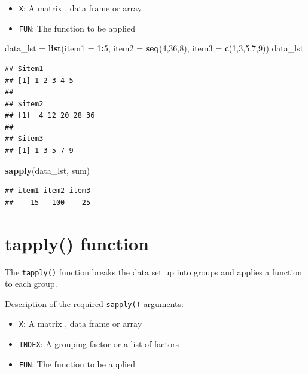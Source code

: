 \documentclass[
]{book}
\newenvironment{Shaded}{\begin{snugshade}}{\end{snugshade}}
\newcommand{\DataTypeTok}[1]{\textcolor[rgb]{0.13,0.29,0.53}{#1}}
\newcommand{\DecValTok}[1]{\textcolor[rgb]{0.00,0.00,0.81}{#1}}
\newcommand{\KeywordTok}[1]{\textcolor[rgb]{0.13,0.29,0.53}{\textbf{#1}}}
\newcommand{\NormalTok}[1]{#1}
\newcommand{\OperatorTok}[1]{\textcolor[rgb]{0.81,0.36,0.00}{\textbf{#1}}}
\newcommand{\StringTok}[1]{\textcolor[rgb]{0.31,0.60,0.02}{#1}}
\providecommand{\tightlist}{%
  \setlength{\itemsep}{0pt}\setlength{\parskip}{0pt}}
\begin{document}
\begin{itemize}
\tightlist
\item
  \texttt{X}: A matrix , data frame or array
\item
  \texttt{FUN}: The function to be applied
\end{itemize}

\begin{Shaded}
\begin{Highlighting}[]
\NormalTok{data_lst =}\StringTok{ }\KeywordTok{list}\NormalTok{(}\DataTypeTok{item1 =} \DecValTok{1}\OperatorTok{:}\DecValTok{5}\NormalTok{,}
                 \DataTypeTok{item2 =} \KeywordTok{seq}\NormalTok{(}\DecValTok{4}\NormalTok{,}\DecValTok{36}\NormalTok{,}\DecValTok{8}\NormalTok{),}
                 \DataTypeTok{item3 =} \KeywordTok{c}\NormalTok{(}\DecValTok{1}\NormalTok{,}\DecValTok{3}\NormalTok{,}\DecValTok{5}\NormalTok{,}\DecValTok{7}\NormalTok{,}\DecValTok{9}\NormalTok{))}
\NormalTok{data_lst}
\end{Highlighting}
\end{Shaded}

\begin{verbatim}
## $item1
## [1] 1 2 3 4 5
## 
## $item2
## [1]  4 12 20 28 36
## 
## $item3
## [1] 1 3 5 7 9
\end{verbatim}

\begin{Shaded}
\begin{Highlighting}[]
\KeywordTok{sapply}\NormalTok{(data_lst, sum)}
\end{Highlighting}
\end{Shaded}

\begin{verbatim}
## item1 item2 item3 
##    15   100    25
\end{verbatim}

\hypertarget{tapply-function}{%
\section{tapply() function}\label{tapply-function}}

The \texttt{tapply()} function breaks the data set up into groups and applies a function to each group.

Description of the required \texttt{sapply()} arguments:

\begin{itemize}
\tightlist
\item
  \texttt{X}: A matrix , data frame or array
\item
  \texttt{INDEX}: A grouping factor or a list of factors
\item
  \texttt{FUN}: The function to be applied
\end{itemize}
\end{document}
